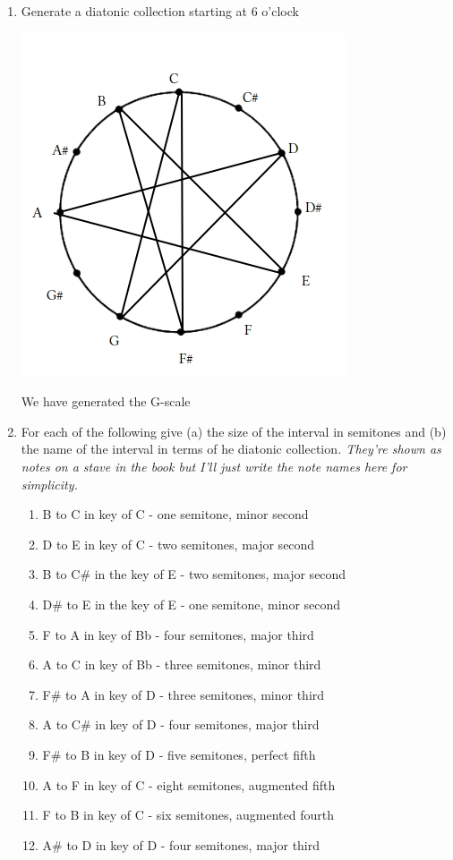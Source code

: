 \documentclass{article}
\begin{document}
\begin{enumerate}
  \item Generate a diatonic collection starting at 6 o'clock
    \begin{center}
    \includegraphics[width=0.5\linewidth]{e2_1.jpg}
    \end{center}
    We have generated the G-scale
  \item For each of the following give (a) the size of the interval in semitones and (b) the name of the interval in terms of he diatonic collection\textit{. They're shown as notes on a stave in the book but I'll just write the note names here for simplicity.}
    \begin{enumerate}
      \item B to C in key of C - one semitone, minor second
      \item D to E in key of C - two semitones, major second
      \item B to C\# in the key of E - two semitones, major second
      \item D\# to E in the key of E - one semitone, minor second
      \item F to A in key of Bb - four semitones, major third
      \item A to C in key of Bb - three semitones, minor third
      \item F\# to A in key of D - three semitones, minor third
      \item A to C\# in key of D - four semitones, major third
      \item F\# to B in key of D - five semitones, perfect fifth
      \item A to F in key of C - eight semitones, augmented fifth
      \item F to B in key of C - six semitones, augmented fourth
      \item A\# to D in key of D - four semitones, major third

\end{enumerate}
\end{enumerate}
\end{document}
